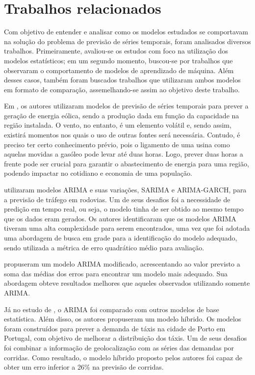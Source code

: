 \documentclass[
    12pt,
    oneside,
    a4paper,
    english,
    brazil
]{abntex2}
\begin{document}
\chapter{Trabalhos relacionados}\label{chap:trab_relacionados}

Com objetivo de entender e analisar como os modelos estudados se comportavam na
solução do problema de previsão  de séries temporais, foram analisados diversos
trabalhos.  Primeiramente, avaliou-se  os estudos  com foco  na utilização  dos
modelos  estatísticos;  em um  segundo  momento,  buscou-se por  trabalhos  que
observaram o  comportamento de modelos  de aprendizado de máquina.  Além desses
casos, também foram buscados trabalhos  que utilizaram ambos modelos em formato
de comparação, assemelhando-se assim ao objetivo deste trabalho.


Em ,  os autores utilizaram modelos  de previsão de
séries temporais para prever a geração de energia eólica, sendo a produção dada
em função da capacidade na região instalada. O vento, no entanto, é um elemento
volátil e, sendo assim, existirá momentos nos quais o uso de outras fontes será
necessária. Contudo, é preciso ter  certo conhecimento prévio, pois o ligamento
de uma usina  como aquelas movidas a  gasóleo pode levar até  duas horas. Logo,
prever duas  horas a frente pode  ser crucial para garantir  o abastecimento de
energia  para uma  região,  podendo impactar  no cotidiano  e  economia de  uma
população.

  utilizaram  modelos  ARIMA   e  suas  variações,  SARIMA  e
ARIMA-GARCH, para a previsão de tráfego em  rodovias. Um de seus desafios foi a
necessidade de predição em tempo real, ou seja, o modelo tinha de ser obtido ao
mesmo tempo que os dados eram  gerados. Os autores identificaram que os modelos
ARIMA tiveram  uma alta complexidade  para serem  encontrados, uma vez  que foi
adotada  uma  abordagem de  busca  em  grade  para  a identificação  do  modelo
adequado, sendo utilizada a métrica de erro quadrático médio para avaliação.

 propuseram um modelo ARIMA modificado, acrescentando ao valor
previsto a  soma das médias dos  erros para encontrar um  modelo mais adequado.
Sua  abordagem obteve  resultados  melhores que  aqueles observados  utilizando
somente ARIMA\@.

Já no estudo  de , o ARIMA foi comparado  com outros modelos
de base  estatística. Além disso, os  autores propuseram um modelo  híbrido. Os
modelos foram construídos para prever a demanda  de táxis na cidade de Porto em
Portugal,  com objetivo  de  melhorar  a distribuição  dos  táxis.  Um de  seus
desafios foi combinar a informação de geolocalização com as séries das demandas
por corridas. Como resultado, o modelo híbrido proposto pelos autores foi capaz
de obter um erro inferior a 26\% na previsão de corridas.
\end{document}
